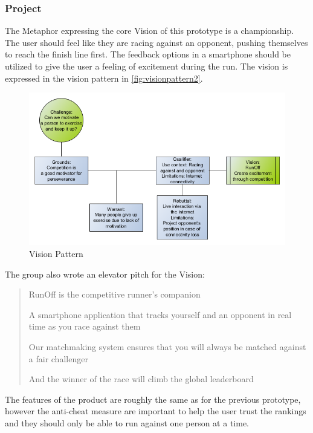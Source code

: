 \subsubsection{Project}
The Metaphor expressing the core Vision of this prototype is a championship. The user should feel like they are racing against an opponent, pushing themselves to reach the finish line first. The feedback options in a smartphone should be utilized to give the user a feeling of excitement during the run. The vision is expressed in the vision pattern in \autoref{fig:visionpattern2}.

\begin{figure}[!ht]
	\begin{center}
		\includegraphics[scale=0.5]{img/visionpattern2.png}
		\caption{Vision Pattern}
		\label{fig:visionpattern2}
	\end{center}
\end{figure}

The group also wrote an elevator pitch for the Vision:

\begin{quotation}
RunOff is the competitive runner's companion

A smartphone application that tracks yourself and an opponent in real time as you race against them

Our matchmaking system ensures that you will always be matched against a fair challenger 

And the winner of the race will climb the global leaderboard
\end{quotation}

The features of the product are roughly the same as for the previous prototype, however the anti-cheat measure are important to help the user trust the rankings and they should only be able to run against one person at a time.


